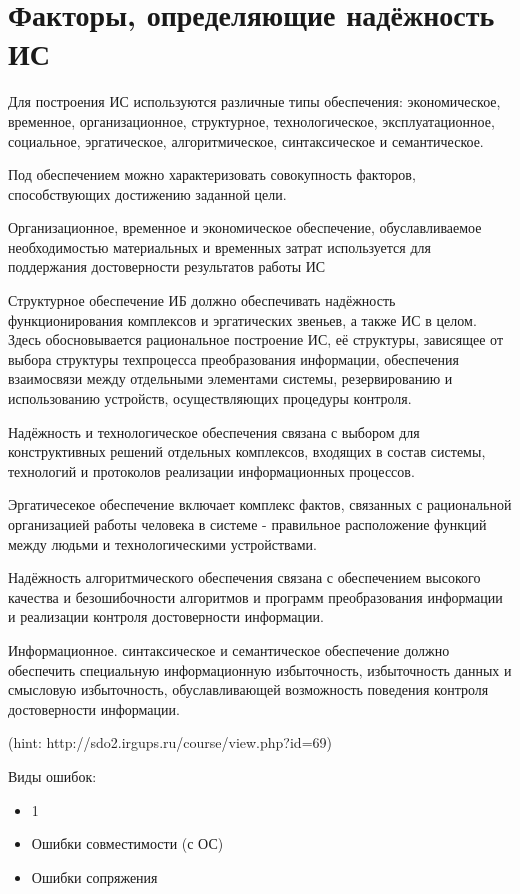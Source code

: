 \documentclass[a4paper, 12pt]{extarticle}
\begin{document}
	\section{Факторы, определяющие надёжность ИС}
		Для построения ИС используются различные типы обеспечения: экономическое, временное, организационное, структурное, технологическое, эксплуатационное, социальное, эргатическое, алгоритмическое, синтаксическое и семантическое.

		Под обеспечением можно характеризовать совокупность факторов, способствующих достижению заданной цели.

		Организационное, временное и экономическое обеспечение, обуславливаемое необходимостью материальных и временных затрат используется для поддержания достоверности результатов работы ИС

		Структурное обеспечение ИБ должно обеспечивать надёжность функционирования комплексов и эргатических звеньев, а также ИС в целом.
		Здесь обосновывается рациональное построение ИС, её структуры, зависящее от выбора структуры техпроцесса преобразования информации, обеспечения взаимосвязи между отдельными элементами системы, резервированию и использованию устройств, осуществляющих процедуры контроля.

		Надёжность и технологическое обеспечения связана с выбором для конструктивных решений отдельных комплексов, входящих в состав системы, технологий и протоколов реализации информационных процессов.

		Эргатичесекое обеспечение включает комплекс фактов, связанных с рациональной организацией работы человека в системе - правильное расположение функций между людьми и технологическими устройствами.

		Надёжность алгоритмического обеспечения связана с обеспечением высокого качества и безошибочности алгоритмов и программ преобразования информации и реализации контроля достоверности информации.

		Информационное. синтаксическое и семантическое обеспечение должно обеспечить специальную информационную избыточность, избыточность данных и смысловую избыточность, обуславливающей возможность поведения контроля достоверности информации.



		(hint: http://sdo2.irgups.ru/course/view.php?id=69)

		Виды ошибок:
		\begin{itemize}
			\item 1
			\item Ошибки совместимости (с ОС)
			\item Ошибки сопряжения
		\end{itemize}
\end{document}
